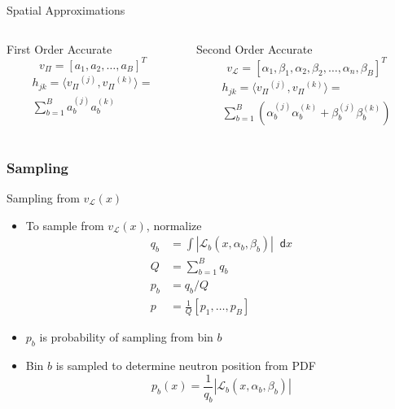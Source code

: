 \documentclass[xcolor={usenames, dvipsnames},]{beamer}
\newcommand{\dd}{\mathop{}\!\mathsf{d}}
\newcommand{\Lin}{\ensuremath{\mathcal{L}}}
\newcommand{\vP}{\ensuremath{v_{\Pi}}}
\newcommand{\vL}{\ensuremath{v_{\Lin}}}
\newcommand{\Lx}{\ensuremath{\Lin_b(x, \alpha_b, \beta_b)}}
\begin{document}
\begin{frame}{Spatial Approximations}
\begin{columns}[t,onlytextwidth]
    \begin{column}{0.45\textwidth}
        \begin{block}{First Order Accurate}
            \begin{equation*}
                \vP = \left[a_1, a_2, \ldots, a_B\right]^T
            \end{equation*}
            \begin{multline*}
                h_{jk} = \langle \vP^{(j)},\vP^{(k)}\rangle = \\
                \sum_{b=1}^B a_b^{(j)}a_b^{(k)}
            \end{multline*}
        \end{block}
    \end{column}
    
    \begin{column}{0.45\textwidth}
        \begin{block}{Second Order Accurate}
        \begin{equation*}
            \vL = \left[\alpha_1, \beta_1, \alpha_2, \beta_2, \ldots, \alpha_n, \beta_B\right]^T
        \end{equation*}
        \begin{multline*}
            h_{jk} = \langle \vP^{(j)},\vP^{(k)}\rangle = \\
            \sum_{b=1}^B \left(\alpha_b^{(j)}\alpha_b^{(k)} + \beta_b^{(j)}\beta_b^{(k)} \right)
        \end{multline*}
        \end{block}
    \end{column}
\end{columns}
\end{frame}

\subsubsection{Sampling}
\begin{frame}{Sampling from $\vL(x)$}
    \begin{itemize}
        \item To sample from $\vL(x)$, normalize
            \begin{align*}
                q_b &= \int \left|\Lx\right| \dd x \\[0.5em]
                Q &= \sum_{b=1}^B q_b \\[0.5em]
                p_b &= q_b/Q \\[0.5em]
                p &= \frac{1}{Q}\left[p_1, \ldots, p_B\right]
            \end{align*}
        \item $p_b$ is probability of sampling from bin $b$
        \item Bin $b$ is sampled to determine neutron position from PDF
            \begin{equation*}
                p_b(x) = \frac{1}{q_b}\left|\Lx\right|
            \end{equation*}
    \end{itemize}
\end{frame}
\end{document}
